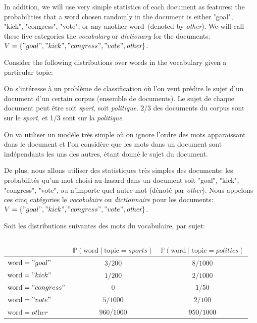 \documentclass[11pt,french,english]{article}
\begin{document}
\begin{enumerate}
{In addition, we will use very simple statistics of each document as features: the probabilities that a word chosen randomly in the document is either "goal", "kick", "congress", "vote", or any another word~(denoted by \textit{other}).
We will call these five categories the \emph{vocabulary} or \emph{dictionary} for the documents: $V=\{"goal","kick ", "congress", "vote", \textit{other}\}$.

Consider the following distributions over words in the vocabulary given a particular topic:
}{On s'intéresse à un problème de classification où l'on veut prédire le sujet d'un document d'un certain corpus (ensemble de documents).
Le sujet de chaque document peut être soit \textit{sport}, soit \textit{politique}. 2/3 des documents du corpus sont sur le \textit{sport}, et 1/3 sont sur la \textit{politique}. 

On va utiliser un modèle très simple où on ignore l'ordre des mots apparaissant dans le document et l'on considère que les mots dans un document sont indépendants les uns des autres, étant donné le sujet du document.

De plus, nous allons utiliser des statistiques très simples des documents: les probabilités qu'un mot choisi au hasard dans un document soit "goal", "kick", "congress", "vote", ou n'importe quel autre mot (dénoté par \textit{other}). Nous appelons ces cinq catégories le \emph{vocabulaire} ou \emph{dictionnaire} pour les documents: $V=\{"goal","kick ", "congress", "vote", \textit{other}\}$.

Soit les distributions suivantes des mots du vocabulaire, par sujet:}


\begin{center}
\begin{table}[h!]
\begin{tabular}{l|cc}
     & $\mathbb{P}(\mathrm{word} \mid \mathrm{topic}=\textit{sports})$ & $\mathbb{P}(\mathrm{word} \mid \mathrm{topic}=\textit{politics})$\\
     \hline 
$\mathrm{word} = "goal"$    & $3/200$& $8/1000$ \\
$\mathrm{word} = "kick"$    & $1/200$& $2/1000$ \\
$\mathrm{word} = "congress"$    & $0$& $1/50$ \\
$\mathrm{word} = "vote"$    & $5/1000$& $2/100$ \\
$\mathrm{word} = \textit{other}$  & $960/1000$ & $950/1000$ 
\end{tabular}
    \caption{}
    \label{tab:bow}
\end{table}
\end{center}


\end{enumerate}
\end{document}
